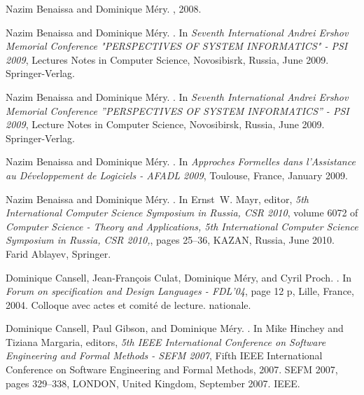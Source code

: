\documentclass[ 12pt]{article}
\begin{document}
\begin{thebibliography}{100}
Nazim Benaissa and Dominique M{\'e}ry.
, 2008.

Nazim Benaissa and Dominique M{\'e}ry.
.
\newblock In {\em {Seventh International Andrei Ershov Memorial Conference
  "PERSPECTIVES OF SYSTEM INFORMATICS" - PSI 2009}}, Lectures Notes in Computer
  Science, Novosibisrk, Russia, June 2009. {Springer-Verlag}.

Nazim Benaissa and Dominique M{\'e}ry.
.
\newblock In {\em {Seventh International Andrei Ershov Memorial Conference
  ''PERSPECTIVES OF SYSTEM INFORMATICS'' - PSI 2009}}, Lecture Notes in
  Computer Science, Novosibirsk, Russia, June 2009. {Springer-Verlag}.

Nazim Benaissa and Dominique M{\'e}ry.
.
\newblock In {\em {Approches Formelles dans l'Assistance au D{\'e}veloppement
  de Logiciels - AFADL 2009}}, Toulouse, France, January 2009.

Nazim Benaissa and Dominique M{\'e}ry.
.
\newblock In Ernst~W. Mayr, editor, {\em {5th International Computer Science
  Symposium in Russia, CSR 2010}}, volume 6072 of {\em Computer Science -
  Theory and Applications, 5th International Computer Science Symposium in
  Russia, CSR 2010,}, pages 25--36, KAZAN, Russia, June 2010. {Farid Ablayev},
  {Springer}.

Dominique Cansell, Jean-Fran{\c c}ois Culat, Dominique M{\'e}ry, and Cyril
  Proch.
.
\newblock In {\em {Forum on specification and Design Languages - FDL'04}}, page
  12 p, Lille, France, 2004.
\newblock Colloque avec actes et comit{\'e} de lecture. nationale.

Dominique Cansell, Paul Gibson, and Dominique M{\'e}ry.
.
\newblock In Mike Hinchey and Tiziana Margaria, editors, {\em {5th IEEE
  International Conference on Software Engineering and Formal Methods - SEFM
  2007}}, Fifth IEEE International Conference on Software Engineering and
  Formal Methods, 2007. SEFM 2007, pages 329--338, LONDON, United Kingdom,
  September 2007. {IEEE}.


\end{thebibliography}
\end{document}
